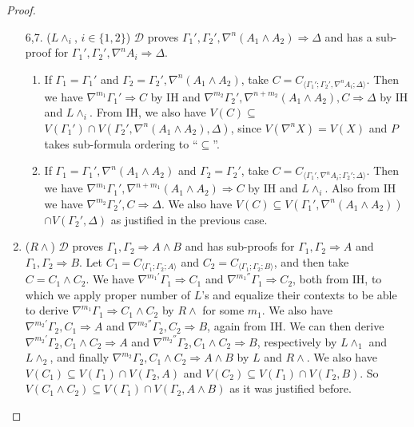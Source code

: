 \begin{proof}
\begin{enumerate}
		\item[6,7.] ($L\land_i$, {\small$i \in \{1,2\}$}) $\mathcal{D}$ proves $\Gamma_1' , \Gamma_2' , \nabla^n (A_1 \land A_2) \Rightarrow \Delta$ and has a sub-proof for $\Gamma_1' , \Gamma_2' , \nabla^n A_i \Rightarrow \Delta$.
		\begin{enumerate}
			\item If $\Gamma_1 = \Gamma_1'$ and $\Gamma_2 = \Gamma_2' , \nabla^n (A_1 \land A_2)$, take $C = C_{\langle\Gamma_1';\Gamma_2',\nabla^n A_i;\Delta\rangle}$. Then we have $\nabla^{m_1} \Gamma_1' \Rightarrow C$ by IH and $\nabla^{m_2} \Gamma_2' , \nabla^{n+m_2} (A_1 \land A_2), C \Rightarrow \Delta$ by IH and $L\land_i$. From IH, we also have $V(C) \subseteq$ $V(\Gamma_1') \cap V(\Gamma_2',\nabla^n(A_1 \land A_2),\Delta)$, since $V(\nabla^n X) = V(X)$ and $P$ takes sub-formula ordering to ``$\subseteq$''.
			
			\item If $\Gamma_1 = \Gamma_1' , \nabla^n (A_1 \land A_2)$ and $\Gamma_2 = \Gamma_2'$, take $C = C_{\langle\Gamma_1',\nabla^n A_i;\Gamma_2';\Delta\rangle}$. Then we have $\nabla^{m_1} \Gamma_1',\nabla^{n+m_1} (A_1 \wedge A_2) \Rightarrow C$ by IH and $L\wedge_i$. Also from IH we have $\nabla^{m_2} \Gamma_2', C \Rightarrow \Delta$. We also have $V(C) \subseteq V(\Gamma_1',\nabla^n (A_1 \land A_2))$ $\cap V(\Gamma_2',\Delta)$ as justified in the previous case.
		\end{enumerate}
		\setcounter{enumi}{7}

		\item ($R\land$) $\mathcal{D}$ proves $\Gamma_1 , \Gamma_2 \Rightarrow A \land B$ and has sub-proofs for $\Gamma_1 , \Gamma_2 \Rightarrow A$ and $\Gamma_1 , \Gamma_2 \Rightarrow B$.
		Let $C_1 = C_{\langle\Gamma_1;\Gamma_2;A\rangle}$ and $C_2 = C_{\langle\Gamma_1;\Gamma_2;B\rangle}$, and then take $C = C_1 \land C_2$.
		We have $\nabla^{m_1'} \Gamma_1 \Rightarrow C_1$ and $\nabla^{m_1''} \Gamma_1 \Rightarrow C_2$, both from IH, to which we apply proper number of $L$'s and equalize their contexts to be able to derive $\nabla^{m_1} \Gamma_1 \Rightarrow C_1 \wedge C_2$ by $R\wedge$ for some $m_1$.
		We also have $\nabla^{m_2'} \Gamma_2 , C_1 \Rightarrow A$ and $\nabla^{m_2''} \Gamma_2 , C_2 \Rightarrow B$, again from IH.
		We can then derive $\nabla^{m_2'} \Gamma_2 , C_1 \land C_2 \Rightarrow A$ and $\nabla^{m_2''} \Gamma_2 , C_1 \land C_2 \Rightarrow B$, respectively by $L\land_1$ and $L\land_2$, and finally  $\nabla^{m_2} \Gamma_2 , C_1 \land C_2 \Rightarrow A \land B$ by $L$ and $R\land$.
		We also have $V(C_1) \subseteq V(\Gamma_1) \cap V(\Gamma_2 , A)$ and $V(C_2) \subseteq V(\Gamma_1) \cap V(\Gamma_2 , B)$. So $V(C_1 \land C_2) \subseteq V(\Gamma_1) \cap V(\Gamma_2 , A \land B)$ as it was justified before.


\end{enumerate}
\end{proof}
